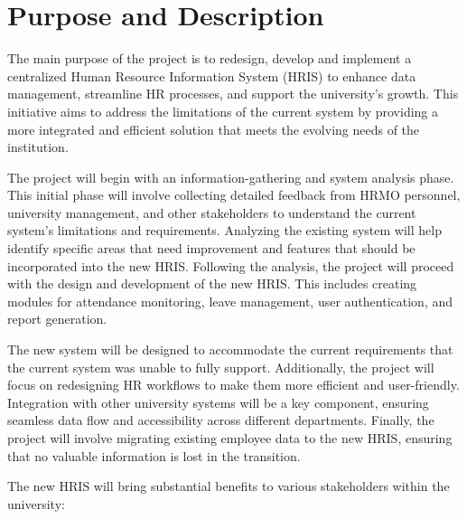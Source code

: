 \section{Purpose and Description}

    The main purpose of the project is to redesign, develop and implement a centralized Human Resource Information System (HRIS) to enhance data management, streamline HR processes, and support the university's growth. This initiative aims to address the limitations of the current system by providing a more integrated and efficient solution that meets the evolving needs of the institution.

    The project will begin with an information-gathering and system analysis phase. This initial phase will involve collecting detailed feedback from HRMO personnel, university management, and other stakeholders to understand the current system's limitations and requirements. Analyzing the existing system will help identify specific areas that need improvement and features that should be incorporated into the new HRIS. Following the analysis, the project will proceed with the design and development of the new HRIS. This includes creating modules for attendance monitoring, leave management, user authentication, and report generation. 
    
    The new system will be designed to accommodate the current requirements that the current system was unable to fully support. Additionally, the project will focus on redesigning HR workflows to make them more efficient and user-friendly. Integration with other university systems will be a key component, ensuring seamless data flow and accessibility across different departments. Finally, the project will involve migrating existing employee data to the new HRIS, ensuring that no valuable information is lost in the transition.

    The new HRIS will bring substantial benefits to various stakeholders within the university:
    
